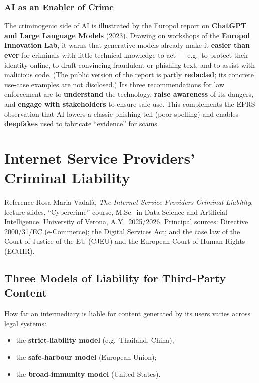 \documentclass[11pt,a4paper,openany]{report}
\theoremstyle{definition}
\theoremstyle{plain}
\theoremstyle{remark}
\begin{document}
\subsection{AI as an Enabler of Crime}

The criminogenic side of AI is illustrated by the Europol report on \textbf{ChatGPT and Large Language Models} (2023). Drawing on workshops of the \textbf{Europol Innovation Lab}, it warns that generative models already make it \textbf{easier than ever} for criminals with little technical knowledge to act --- e.g.\ to protect their identity online, to draft convincing fraudulent or phishing text, and to assist with malicious code. (The public version of the report is partly \textbf{redacted}; its concrete use-case examples are not disclosed.) Its three recommendations for law enforcement are to \textbf{understand} the technology, \textbf{raise awareness} of its dangers, and \textbf{engage with stakeholders} to ensure safe use. This complements the EPRS observation that AI lowers a classic phishing tell (poor spelling) and enables \textbf{deepfakes} used to fabricate ``evidence'' for scams.

\chapter{Internet Service Providers' Criminal Liability}
\label{chap:isp}

\begin{sourcebox}{Reference}
Rosa Maria Vadal\`a, \textit{The Internet Service Providers Criminal Liability}, lecture slides, ``Cybercrime'' course, M.Sc.\ in Data Science and Artificial Intelligence, University of Verona, A.Y.\ 2025/2026. Principal sources: Directive 2000/31/EC (e-Commerce); the Digital Services Act; and the case law of the Court of Justice of the EU (CJEU) and the European Court of Human Rights (ECtHR).
\end{sourcebox}

\section{Three Models of Liability for Third-Party Content}

How far an intermediary is liable for content generated by its users varies across legal systems:
\begin{itemize}
    \item the \textbf{strict-liability model} (e.g.\ Thailand, China);
    \item the \textbf{safe-harbour model} (European Union);
    \item the \textbf{broad-immunity model} (United States).
\end{itemize}
\end{document}

